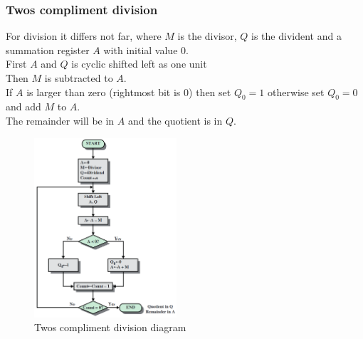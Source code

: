 \documentclass[12pt, a4paper]{article}
\begin{document}
			\subsubsection{Twos compliment division}
				For division it differs not far, where $M$ is the divisor, $Q$ is the divident and a summation register $A$ with initial value 0.\\
				First $A$ and $Q$ is cyclic shifted left as one unit\\
				Then $M$ is subtracted to $A$.\\
				If $A$ is larger than zero (rightmost bit is 0) then set $Q_0=1$ otherwise set $Q_0=0$ and add $M$ to $A$.\\
				The remainder will be in $A$ and the quotient is in $Q$.
				\begin{figure}[h!]
					\includegraphics[width=200px]{assets/twosComplimentDivision.png}
					\centering
					\caption{Twos compliment division diagram}
				\end{figure}
\end{document}
